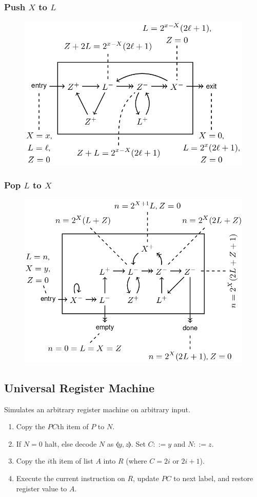 \documentclass[twocolumn,english]{article}
\begin{document}
\subsubsection*{Push $X$ to $L$}

\begin{figure}[H]
\centering{}\includegraphics[width=0.65\columnwidth]{img/push} 
\end{figure}



\subsubsection*{Pop $L$ to $X$}

\begin{figure}[H]
\centering{}\includegraphics[width=0.675\columnwidth]{img/pop} 
\end{figure}



\subsection{Universal Register Machine}

Simulates an arbitrary register machine on arbitrary input. 
\begin{enumerate}
\item Copy the $PC$th item of $P$ to $N$. 
\item If $N=0$ halt, else decode $N$ as $\llangle y,z\rrangle$. Set $C::=y$
and $N::=z$. 
\item Copy the $i$th item of list $A$ into $R$ (where $C=2i$ or $2i+1$). 
\item Execute the current instruction on $R$, update $PC$ to next label,
and restore register value to $A$. 
\end{enumerate}
\end{document}
